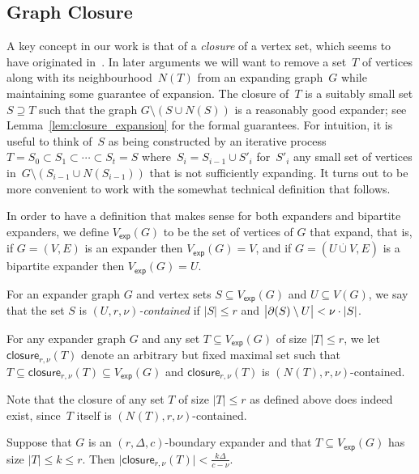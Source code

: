 \documentclass{theoretics}
\newcommand{\boundary}[1]{\ensuremath{\partial #1}}
\newcommand{\Setsize}[1]{\bigl\lvert#1\bigr\rvert}
\newcommand{\setsize}[1]{\lvert#1\rvert}
\newcommand{\disjointunion}{\overset{.}{\cup}}
\newcommand{\reflem}[1]{Lemma~\ref{#1}}
\newcommand{\neigh}[2][]{N_{{#1}}(#2)}
\newcommand{\uniqueNeigh}[2][]{\boundary_{{#1}} ({#2})}
\newcommand{\GdegMax}{\Delta}
\newcommand{\gdegmax}{\GdegMax}
\newcommand{\contained}[3]{$(#1, #2, #3)$-contained}
\newcommand{\closure}[2][]{\mathsf{closure}_{{#1}}(#2)}
\newcommand{\expansionconst}{c}
\newcommand{\almostcontained}{\nu}
\newcommand{\setsizemax}{k}
\newcommand{\squeezesubsection}[1]{\subsection{#1}}
\numberwithin{equation}{section}
\begin{document}
\squeezesubsection{Graph Closure}

\newcommand{\Vexp}{V_{\mathsf{exp}}}

A key concept in our work is that of a \emph{closure} of a vertex set,
which seems to have originated
in~\cite{ABRW04Pseudorandom,AR03LowerBounds}. In later arguments we
will want to remove a set~$T$ of vertices along with its
neighbourhood~$N(T)$ from an expanding graph~$G$ while maintaining
some guarantee of expansion. The closure of~$T$ is a suitably small
set $S \supseteq T$ such that the graph $G\setminus (S \cup N(S))$ is
a reasonably good expander; see \reflem{lem:closure_expansion} for the
formal guarantees. For intuition, it is useful to think of~$S$ as being
constructed by an iterative
process~$T = S_0 \subset S_1 \subset \cdots \subset S_t = S$
where~$S_i = S_{i-1} \cup S'_i$ for~$S'_i$ any small set of vertices
in~$G\setminus (S_{i-1} \cup N(S_{i-1}))$ that is not sufficiently
expanding. It turns out to be more convenient to work with the
somewhat technical definition that follows.

In order to have a definition that makes sense for both expanders and
bipartite expanders, we define $\Vexp(G)$ to be the set of vertices of
$G$ that expand, that is, if $G=(V,E)$ is an expander then
$\Vexp(G) = V$, and if $G=(U\disjointunion V, E)$ is a bipartite
expander then $\Vexp(G) = U$.

\begin{definition}[Closure]\label{def:closure}
  For an expander graph $G$ and
  vertex sets $S \subseteq \Vexp(G) $ and $U \subseteq V(G)$,
  we say that
  the set $S$ is \emph{\contained{U}{r}{\almostcontained}} if
  $\setsize{S} \le r$ 
  and 
  $
  \Setsize{
    \uniqueNeigh{S} \setminus U
  }
  <
  \almostcontained \cdot \setsize{S}$. 

  For any expander graph $G$  and any set $T \subseteq \Vexp(G)$       of size $\setsize{T} \leq r$, we let
  $\closure[r, \almostcontained]{T}$
  denote an arbitrary but fixed maximal set
  such that
  $T \subseteq \closure[r, \almostcontained]{T} \subseteq \Vexp(G)$
  and  $\closure[r, \almostcontained]{T}$ is
  \contained{\neigh{T}}{r}{\almostcontained}.
\end{definition}

Note that the closure of any set $T$ of size 
$\setsize{T} \le r$ as defined above does indeed exist, since~$T$ itself is
\contained{\neigh{T}}{r}{\almostcontained}.

\begin{lemma}\label{lem:closure_size}
  Suppose that $G$ 
  is an $(r, \gdegmax, \expansionconst )$-boundary expander
  and that
  $T \subseteq \Vexp(G)$ has size $\setsize{T} \le \setsizemax \le r$. 
  Then
  $\setsize{ \closure[r, \almostcontained]{T} } < 
  \frac{\setsizemax \GdegMax}{\expansionconst -
    \almostcontained}$.
\end{lemma}
\end{document}
